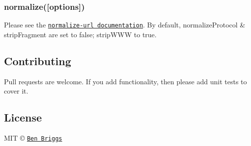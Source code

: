 \subsubsection*{normalize(\mbox{[}options\mbox{]})}

Please see the \href{https://github.com/sindresorhus/normalize-url#options}{\tt normalize-\/url documentation}. By default, {\ttfamily normalize\+Protocol} \& {\ttfamily strip\+Fragment} are set to {\ttfamily false}; {\ttfamily strip\+W\+WW} to {\ttfamily true}.

\subsection*{Contributing}

Pull requests are welcome. If you add functionality, then please add unit tests to cover it.

\subsection*{License}

M\+IT © \href{http://beneb.info}{\tt Ben Briggs} 
